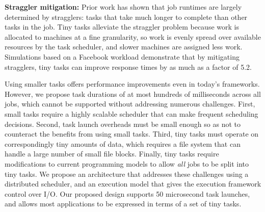 \noindent\textbf{Straggler mitigation:}
Prior work has shown that job runtimes are largely determined by
stragglers: tasks that take much longer to complete than other tasks in the
job.
Tiny tasks alleviate the straggler problem because work is allocated to
machines at a fine granularity, so work is evenly spread
over available resources by the task scheduler, and slower machines are assigned
less work. Simulations based on a Facebook workload
demonstrate that by mitigating stragglers, tiny tasks
can improve response times by as much as a factor of 5.2.


Using smaller tasks offers performance improvements even in
today's frameworks.  However, we propose task durations of at most
hundreds of milliseconds across all jobs, which cannot be supported without addressing
numerous challenges. First, small tasks require a highly scalable scheduler
that can make frequent scheduling decisions. Second,
task launch overheads must be small enough so as not to counteract the
benefits from using small tasks.
Third, tiny tasks must operate on correspondingly tiny amounts
of data, which requires a file system that can handle a large number of
small file blocks. Finally, tiny tasks require modifications to current programming
models to allow \emph{all} jobs to be split into tiny tasks. We propose an
architecture that addresses these challenges using a distributed scheduler, and an execution model that gives the execution framework control
over I/O. Our proposed design supports
50 microsecond task launches, and allows most applications to be
expressed in terms of a set of tiny tasks.

